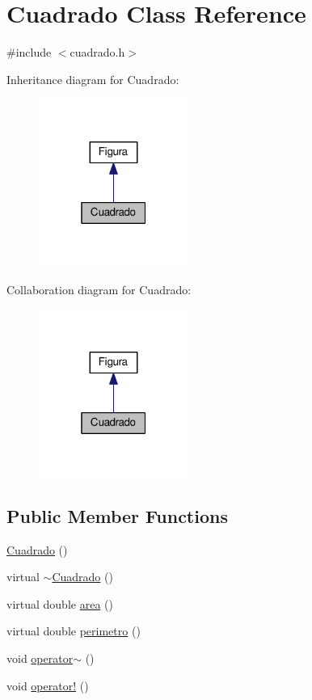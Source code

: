 \hypertarget{classCuadrado}{}\section{Cuadrado Class Reference}
\label{classCuadrado}


{\ttfamily \#include $<$cuadrado.\+h$>$}



Inheritance diagram for Cuadrado\+:
\nopagebreak
\begin{figure}[H]
\begin{center}
\leavevmode
\includegraphics[width=139pt]{classCuadrado__inherit__graph}
\end{center}
\end{figure}


Collaboration diagram for Cuadrado\+:
\nopagebreak
\begin{figure}[H]
\begin{center}
\leavevmode
\includegraphics[width=139pt]{classCuadrado__coll__graph}
\end{center}
\end{figure}
\subsection*{Public Member Functions}
\begin{DoxyCompactItemize}
\item 
\hyperlink{classCuadrado_ad28d9dddc29e1987ec620b07b0a4acc9}{Cuadrado} ()
\item 
virtual \hyperlink{classCuadrado_a9f5bf29c9b8368ad45a4a3c12f9fd7c2}{$\sim$\+Cuadrado} ()
\item 
virtual double \hyperlink{classCuadrado_a379a755de0b95f295e30e6049e19426c}{area} ()
\item 
virtual double \hyperlink{classCuadrado_aa7072852e41bde681376b57503495c74}{perimetro} ()
\item 
void \hyperlink{classCuadrado_a6303f81de8d357f415d00a116b73a6fc}{operator$\sim$} ()
\item 
void \hyperlink{classCuadrado_a78be5dcef640ad7f82858f44fb623af5}{operator!} ()
\end{DoxyCompactItemize}
